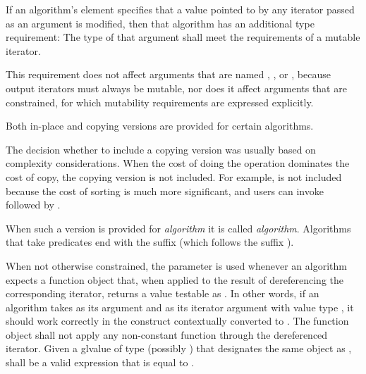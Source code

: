 \pnum
If an algorithm's \effects element specifies
that a value pointed to by any iterator passed as an argument is modified,
then that algorithm has an additional type requirement:
The type of that argument shall meet
the requirements of a mutable iterator.
\begin{note}
This requirement does not affect arguments that are named
, , or ,
because output iterators must always be mutable, nor
does it affect arguments that are constrained,
for which mutability requirements are expressed explicitly.
\end{note}

\pnum
Both in-place and copying versions are provided for certain algorithms.
\begin{footnote}
The decision whether to include a copying version was
usually based on complexity considerations.
When the cost of doing the operation dominates the cost of copy,
the copying version is not included.
For example,  is not included
because the cost of sorting is much more significant,
and users can invoke  followed by .
\end{footnote}
When such a version is provided for \textit{algorithm} it is called
\textit{algorithm}.
Algorithms that take predicates end with the suffix 
(which follows the suffix ).

\pnum
When not otherwise constrained, the  parameter is used
whenever an algorithm expects a function object that,
when applied to the result of dereferencing the corresponding iterator,
returns a value testable as .
In other words,
if an algorithm takes  as its argument and
 as its iterator argument with value type ,
it should work correctly in the construct
 contextually converted to .
The function object  shall not apply any non-constant function
through the dereferenced iterator.
Given a glvalue  of type (possibly ) 
that designates the same object as ,
 shall be a valid expression
that is equal to .

